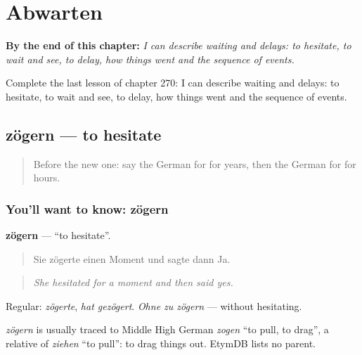 
\chapter{Abwarten}
\label{ch:ge-abwarten}

\begin{chapteropening}
\textbf{By the end of this chapter:} \emph{I can describe waiting and delays: to hesitate, to wait and see, to delay, how things went and the sequence of events.}

Complete the last lesson of chapter 270: I can describe waiting and delays: to hesitate, to wait and see, to delay, how things went and the sequence of events.
\end{chapteropening}

\section[zögern]{zögern — to hesitate}

\label{lesson:GE-C270-zoegern}



\begin{quote}
Before the new one: say the German for for years, then the German for for hours.
\end{quote}

\subsection*{You'll want to know: zögern}
\textbf{zögern} — \textquotedblleft{}to hesitate\textquotedblright{}.

\begin{quote}
Sie zögerte einen Moment und sagte dann Ja.
\end{quote}

\begin{quote}
\emph{She hesitated for a moment and then said yes.}
\end{quote}

Regular: \emph{zögerte}, \emph{hat gezögert}. \emph{Ohne zu zögern} — without hesitating.

\begin{cousinweb}
\emph{zögern} is usually traced to Middle High German \emph{zogen} \textquotedblleft{}to pull, to drag\textquotedblright{}, a relative of \emph{ziehen} \textquotedblleft{}to pull\textquotedblright{}: to drag things out. EtymDB lists no parent.
\end{cousinweb}

